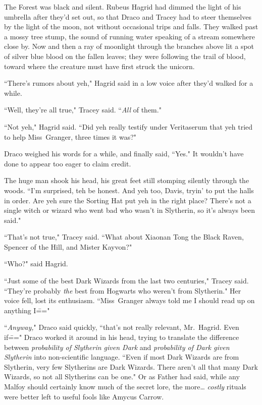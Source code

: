 The Forest was black and silent. Rubeus Hagrid had dimmed the light of his umbrella after they'd set out, so that Draco and Tracey had to steer themselves by the light of the moon, not without occasional trips and falls. They walked past a mossy tree stump, the sound of running water speaking of a stream somewhere close by. Now and then a ray of moonlight through the branches above lit a spot of silver blue blood on the fallen leaves; they were following the trail of blood, toward where the creature must have first struck the unicorn.

``There's rumors about yeh," Hagrid said in a low voice after they'd walked for a while.

``Well, they're all true," Tracey said. ``\emph{All} of them."

``Not yeh," Hagrid said. ``Did yeh really testify under Veritaserum that yeh tried to help Miss~Granger, three times it was?"

Draco weighed his words for a while, and finally said, ``Yes." It wouldn't have done to appear too eager to claim credit.

The huge man shook his head, his great feet still stomping silently through the woods. ``I'm surprised, teh be honest. And yeh too, Davis, tryin' to put the halls in order. Are yeh sure the Sorting Hat put yeh in the right place? There's not a single witch or wizard who went bad who wasn't in Slytherin, so it's always been said."

``That's not true," Tracey said. ``What about Xiaonan Tong the Black Raven, Spencer of the Hill, and Mister Kayvon?"

``Who?" said Hagrid.

``Just some of the best Dark Wizards from the last two centuries," Tracey said. ``They're probably \emph{the} best from Hogwarts who weren't from Slytherin." Her voice fell, lost its enthusiasm. ``Miss~Granger always told me I should read up on anything I\==="

``\emph{Anyway,}" Draco said quickly, ``that's not really relevant, Mr.~Hagrid. Even if\===" Draco worked it around in his head, trying to translate the difference between \emph{probability of Slytherin given Dark} and \emph{probability of Dark given Slytherin} into non-scientific language. ``Even if most Dark Wizards are from Slytherin, very few Slytherins are Dark Wizards. There aren't all that many Dark Wizards, so not all Slytherins can be one." Or as Father had said, while any Malfoy should certainly know much of the secret lore, the more{\ldots} \emph{costly} rituals were better left to useful fools like Amycus Carrow.

